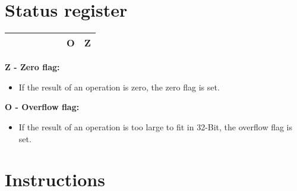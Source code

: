 \documentclass[titlepage]{scrartcl}
\begin{document}
\section{Status register}
\begin{tabularx}{\textwidth}{|Y|Y|Y|Y|Y|Y|Y|Y|}
	\hline
	 &  &  &  &  &  & \textbf{O} & \textbf{Z} \\
	\hline
\end{tabularx}


\newcommand{\flagdesc}[3]{
	\hfill \break
	\textbf{#2 - #1 flag:}
	\begin{itemize}
		\item #3
	\end{itemize}
}

\flagdesc{Zero}{Z}{If the result of an operation is zero, the zero flag is set.}
\flagdesc{Overflow}{O}{If the result of an operation is too large to fit in 32-Bit, the overflow flag is set.}
\newpage

\section{Instructions}

\newcommand{\instruction}[9]{
	\subsection{#1 - #2}
	\begin{tabularx}{\textwidth}{XXX}
		\textbf{Description:}     &                   &                          \\
		\multicolumn{3}{>{\hsize=\dimexpr3\hsize+3\tabcolsep}X}{#3}              \\ [1ex]
		\textbf{Operation:}       &                   &                          \\
		\multicolumn{3}{>{\hsize=\dimexpr3\hsize+3\tabcolsep}X}{#4}              \\ [1ex]
		\textbf{Syntax}           & \textbf{Operands} & \textbf{Program counter} \\
		\texttt{#5}               & #6                & #7                       \\ [1ex]
		\textbf{Opcode:}          &                   &                          \\
		\multicolumn{3}{>{\hsize=\dimexpr3\hsize+3\tabcolsep}X}{#8}              \\ [1ex]
		\textbf{Status register:} &                   &                          \\
		\multicolumn{3}{>{\hsize=\dimexpr3\hsize+3\tabcolsep}X}{#9}              \\ [1ex]
	\end{tabularx}
	\newpage
}
\end{document}
